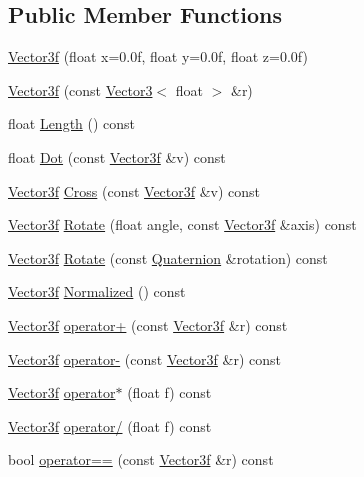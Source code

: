 \subsection*{Public Member Functions}
\begin{DoxyCompactItemize}
\item 
\hyperlink{class_vector3f_a83ea28e272c27ddaa8c0d2c703850bcb}{Vector3f} (float x=0.\+0f, float y=0.\+0f, float z=0.\+0f)
\item 
\hyperlink{class_vector3f_adf12e9520dbe1870db90f61da7c7e439}{Vector3f} (const \hyperlink{class_vector3}{Vector3}$<$ float $>$ \&r)
\item 
float \hyperlink{class_vector3f_a355e21a71ae0d55ae26ccf2a3739a4e1}{Length} () const 
\item 
float \hyperlink{class_vector3f_a971a55e8f4724edcad60f5b14f953906}{Dot} (const \hyperlink{class_vector3f}{Vector3f} \&v) const 
\item 
\hyperlink{class_vector3f}{Vector3f} \hyperlink{class_vector3f_aa08a1a02eb2e991f26231edeb0811acf}{Cross} (const \hyperlink{class_vector3f}{Vector3f} \&v) const 
\item 
\hyperlink{class_vector3f}{Vector3f} \hyperlink{class_vector3f_a64cb066d442f06446d34790fbee18423}{Rotate} (float angle, const \hyperlink{class_vector3f}{Vector3f} \&axis) const 
\item 
\hyperlink{class_vector3f}{Vector3f} \hyperlink{class_vector3f_a352f95e22f448bb5ba17d44077db0a92}{Rotate} (const \hyperlink{class_quaternion}{Quaternion} \&rotation) const 
\item 
\hyperlink{class_vector3f}{Vector3f} \hyperlink{class_vector3f_a96d4153d8f724afc0da1ad0d9a78b358}{Normalized} () const 
\item 
\hyperlink{class_vector3f}{Vector3f} \hyperlink{class_vector3f_af045d6419eba34fecf0a06d5f05950ec}{operator+} (const \hyperlink{class_vector3f}{Vector3f} \&r) const 
\item 
\hyperlink{class_vector3f}{Vector3f} \hyperlink{class_vector3f_a2fdf46c83defdd5de1286aeda25cdbcb}{operator-\/} (const \hyperlink{class_vector3f}{Vector3f} \&r) const 
\item 
\hyperlink{class_vector3f}{Vector3f} \hyperlink{class_vector3f_a7e7fe965ab6b026df5494fff5d8f5080}{operator$\ast$} (float f) const 
\item 
\hyperlink{class_vector3f}{Vector3f} \hyperlink{class_vector3f_aa57991e73045b5f57216e1020bda021a}{operator/} (float f) const 
\item 
bool \hyperlink{class_vector3f_acfee43096f6cdfa042fab3defe7c253b}{operator==} (const \hyperlink{class_vector3f}{Vector3f} \&r) const 

\end{DoxyCompactItemize}
